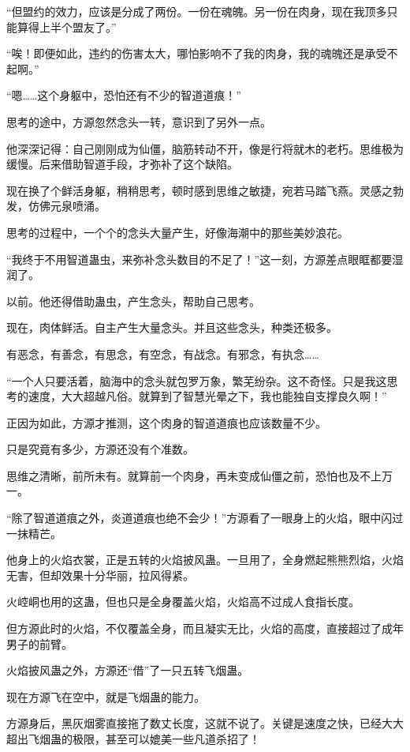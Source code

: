 \begin{this_body}
“但盟约的效力，应该是分成了两份。一份在魂魄。另一份在肉身，现在我顶多只能算得上半个盟友了。”

“唉！即便如此，违约的伤害太大，哪怕影响不了我的肉身，我的魂魄还是承受不起啊。”

“嗯……这个身躯中，恐怕还有不少的智道道痕！”

思考的途中，方源忽然念头一转，意识到了另外一点。

他深深记得：自己刚刚成为仙僵，脑筋转动不开，像是行将就木的老朽。思维极为缓慢。后来借助智道手段，才弥补了这个缺陷。

现在换了个鲜活身躯，稍稍思考，顿时感到思维之敏捷，宛若马踏飞燕。灵感之勃发，仿佛元泉喷涌。

思考的过程中，一个个的念头大量产生，好像海潮中的那些美妙浪花。

“我终于不用智道蛊虫，来弥补念头数目的不足了！”这一刻，方源差点眼眶都要湿润了。

以前。他还得借助蛊虫，产生念头，帮助自己思考。

现在，肉体鲜活。自主产生大量念头。并且这些念头，种类还极多。

有恶念，有善念，有思念，有空念，有战念。有邪念，有执念……

“一个人只要活着，脑海中的念头就包罗万象，繁芜纷杂。这不奇怪。只是我这思考的速度，大大超越凡俗。就算到了智慧光晕之下，我也能独自支撑良久啊！”

正因为如此，方源才推测，这个肉身的智道道痕也应该数量不少。

只是究竟有多少，方源还没有个准数。

思维之清晰，前所未有。就算前一个肉身，再未变成仙僵之前，恐怕也及不上万一。

“除了智道道痕之外，炎道道痕也绝不会少！”方源看了一眼身上的火焰，眼中闪过一抹精芒。

他身上的火焰衣裳，正是五转的火焰披风蛊。一旦用了，全身燃起熊熊烈焰，火焰无害，但却效果十分华丽，拉风得紧。

火崆峒也用的这蛊，但也只是全身覆盖火焰，火焰高不过成人食指长度。

但方源此时的火焰，不仅覆盖全身，而且凝实无比，火焰的高度，直接超过了成年男子的前臂。

火焰披风蛊之外，方源还“借”了一只五转飞烟蛊。

现在方源飞在空中，就是飞烟蛊的能力。

方源身后，黑灰烟雾直接拖了数丈长度，这就不说了。关键是速度之快，已经大大超出飞烟蛊的极限，甚至可以媲美一些凡道杀招了！


\end{this_body}
